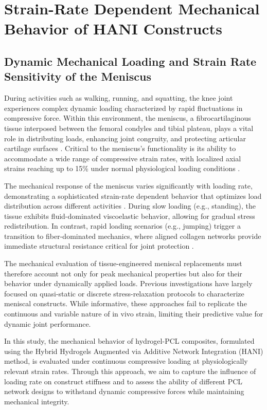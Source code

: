 \chapter{Strain-Rate Dependent Mechanical Behavior of HANI Constructs}\label{chap:6}


\section{Dynamic Mechanical Loading and Strain Rate Sensitivity of the Meniscus}

During activities such as walking, running, and squatting, the knee joint experiences complex dynamic loading characterized by rapid fluctuations in compressive force. Within this environment, the meniscus, a fibrocartilaginous tissue interposed between the femoral condyles and tibial plateau, plays a vital role in distributing loads, enhancing joint congruity, and protecting articular cartilage surfaces \citep{thambyah2006mechanicalproperties}. Critical to the meniscus's functionality is its ability to accommodate a wide range of compressive strain rates, with localized axial strains reaching up to 15\% under normal physiological loading conditions \citep{morejon2020compressiveproperties}.

The mechanical response of the meniscus varies significantly with loading rate, demonstrating a sophisticated strain-rate dependent behavior that optimizes load distribution across different activities \citep{danso2014comparisonnonlinear}. During slow loading (e.g., standing), the tissue exhibits fluid-dominated viscoelastic behavior, allowing for gradual stress redistribution. In contrast, rapid loading scenarios (e.g., jumping) trigger a transition to fiber-dominated mechanics, where aligned collagen networks provide immediate structural resistance critical for joint protection \citep{morejon2023tensileenergy, norberg2021viscoelasticequilibrium}.

The mechanical evaluation of tissue-engineered meniscal replacements must therefore account not only for peak mechanical properties but also for their behavior under dynamically applied loads. Previous investigations have largely focused on quasi-static or discrete stress-relaxation protocols to characterize meniscal constructs. While informative, these approaches fail to replicate the continuous and variable nature of in vivo strain, limiting their predictive value for dynamic joint performance.

In this study, the mechanical behavior of hydrogel-PCL composites, formulated using the Hybrid Hydrogels Augmented via Additive Network Integration (HANI) method, is evaluated under continuous compressive loading at physiologically relevant strain rates. Through this approach, we aim to capture the influence of loading rate on construct stiffness and to assess the ability of different PCL network designs to withstand dynamic compressive forces while maintaining mechanical integrity.

